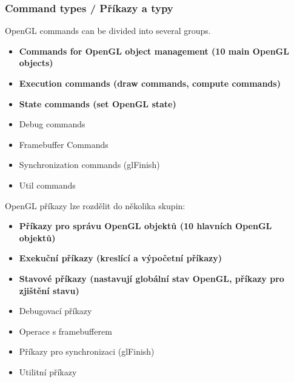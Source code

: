 \begin{frame}\frametitle{Command types / Příkazy a typy}
\scriptsize
OpenGL commands can be divided into several groups.
\begin{itemize}
  \item \textbf{Commands for OpenGL object management (10 main OpenGL objects)}
  \item \textbf{Execution commands (draw commands, compute commands)}
  \item \textbf{State commands (set OpenGL state)}
  \item Debug commands
  \item Framebuffer Commands
  \item Synchronization commands (glFinish)
  \item Util commands
\end{itemize}

OpenGL příkazy lze rozdělit do několika skupin:
\begin{itemize}
  \item \textbf{Příkazy pro správu OpenGL objektů (10 hlavních OpenGL objektů)}
  \item \textbf{Exekuční příkazy (kreslící a výpočetní příkazy)}
  \item \textbf{Stavové příkazy (nastavují globální stav OpenGL, příkazy pro zjištění stavu)}
  \item Debugovací příkazy
  \item Operace s framebufferem
  \item Příkazy pro synchronizaci (glFinish)
  \item Utilitní příkazy
\end{itemize}
\end{frame}


